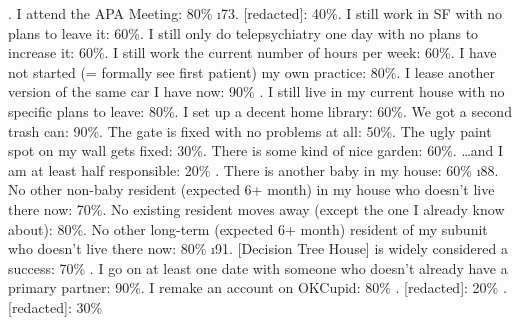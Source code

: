 \begin{xmlentries}
\begin{xmlentriescontent}
{\br
{}
\br
{}\br
{}\br
{}\br
{}\br
{}\br
{}\br
{}\br
{}
. I attend the APA Meeting: 80\%\br
{}\br
\i{73. [redacted]: 40\%}. I still work in SF with no plans to leave it: 60\%. I still only do telepsychiatry one day with no plans to increase it: 60\%. I still work the current number of hours per week: 60\%. I have not started (= formally see first patient) my own practice: 80\%. I lease another version of the same car I have now: 90\%
. I still live in my current house with no specific plans to leave: 80\%. I set up a decent home library: 60\%. We got a second trash can: 90\%. The gate is fixed with no problems at all: 50\%. The ugly paint spot on my wall gets fixed: 30\%. There is some kind of nice garden: 60\%. …and I am at least half responsible: 20\%\br
{}. There is another baby in my house: 60\%\br
\i{88. No other non-baby resident (expected 6+ month) in my house who doesn’t live there now: 70\%}. No existing resident moves away (except the one I already know about): 80\%. No other long-term (expected 6+ month) resident of my subunit who doesn’t live there now: 80\%\br
\i{91. [Decision Tree House] is widely considered a success: 70\%}\br
{}
\br
{}. I go on at least one date with someone who doesn’t already have a primary partner: 90\%. I remake an account on OKCupid: 80\%\br
{}\br
{}\br
{}\br
{}. [redacted]: 20\%\br
{}\br
{}. [redacted]: 30\%\br
{}\br
}
\end{xmlentriescontent}
\end{xmlentries}
